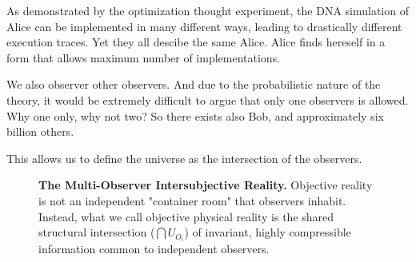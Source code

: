 \newpage


As demonstrated by the optimization thought experiment, the DNA simulation of Alice
can be implemented in many different ways, leading to drastically different execution traces.
Yet they all descibe the same Alice. Alice finds hereself in a form that allows maximum
number of implementations.

We also observer other observers. And due to the probabilistic nature
of the theory, it would be extremely difficult to argue that only one
observers is allowed. Why one only, why not two? So there exists also Bob,
and approximately six billion others.

This allows us to define the universe as the intersection
of the observers.

\begin{figure}[htbp]
\centering
{}
\caption{\textbf{The Multi-Observer Intersubjective Reality.} Objective reality is not an independent "container room" that observers inhabit.
  Instead, what we call objective physical reality is the shared structural intersection ($\bigcap U_{O_i}$) of invariant,
  highly compressible information common to independent observers.}
\label{fig:diag4}
\end{figure}


